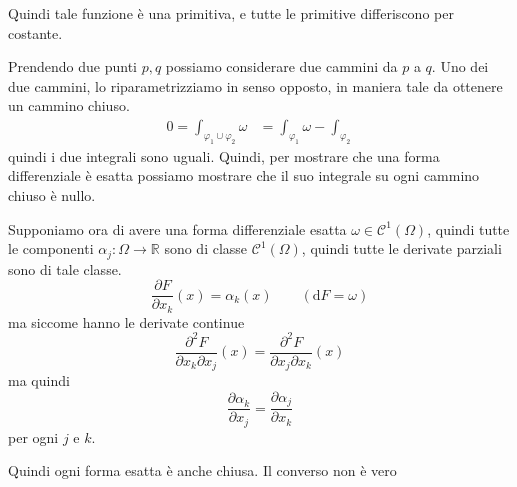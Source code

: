 \documentclass[a4paper]{article}
\begin{document}
Quindi tale funzione è una primitiva, e tutte le primitive differiscono per costante.


Prendendo due punti \(p, q\) possiamo considerare due cammini da \(p\) a \(q\).
Uno dei due cammini, lo riparametrizziamo in senso opposto, in maniera tale da ottenere
un cammino chiuso.
\begin{align*}
    0 = \int_{\varphi_1 \cup \varphi_2} \omega
    &= \int_{\varphi_1} \omega - \int_{\varphi_2}
\end{align*}
quindi i due integrali sono uguali.
Quindi, per mostrare che una forma differenziale è esatta possiamo
mostrare che il suo integrale su ogni cammino chiuso è nullo.

Supponiamo ora di avere una forma differenziale esatta \(\omega \in \mathcal{C}^1(\Omega)\),
quindi tutte le componenti \(\alpha_j \colon \Omega \to \mathbb{R}\)
sono di classe \(\mathcal{C}^1(\Omega)\), quindi tutte le derivate parziali sono di tale classe.
\[
    \frac{\partial F}{\partial x_k}(x) = \alpha_k(x) \qquad (\text{d}F = \omega)
\]
ma siccome hanno le derivate continue
\[
    \frac{\partial^2 F}{\partial x_k \partial x_j}(x)
    =
    \frac{\partial^2 F}{\partial x_j \partial x_k}(x)
\]
ma quindi
\[
    \frac{\partial \alpha_k}{\partial x_j} =
    \frac{\partial \alpha_j}{\partial x_k}
\]
per ogni \(j\) e \(k\).



Quindi ogni forma esatta è anche chiusa. Il converso non è vero

\end{document}
